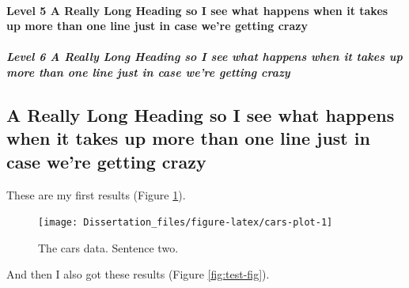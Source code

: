 \documentclass[
  10pt,
]{report}
\begin{document}
\hypertarget{level-5-a-really-long-heading-so-i-see-what-happens-when-it-takes-up-more-than-one-line-just-in-case-were-getting-crazy}{%
\paragraph{Level 5 A Really Long Heading so I see what happens when it takes up more than one line just in case we're getting crazy}\label{level-5-a-really-long-heading-so-i-see-what-happens-when-it-takes-up-more-than-one-line-just-in-case-were-getting-crazy}}

\hypertarget{level-6-a-really-long-heading-so-i-see-what-happens-when-it-takes-up-more-than-one-line-just-in-case-were-getting-crazy}{%
\subparagraph{Level 6 A Really Long Heading so I see what happens when it takes up more than one line just in case we're getting crazy}\label{level-6-a-really-long-heading-so-i-see-what-happens-when-it-takes-up-more-than-one-line-just-in-case-were-getting-crazy}}

\hypertarget{a-really-long-heading-so-i-see-what-happens-when-it-takes-up-more-than-one-line-just-in-case-were-getting-crazy-1}{%
\subsection{A Really Long Heading so I see what happens when it takes up more than one line just in case we're getting crazy}\label{a-really-long-heading-so-i-see-what-happens-when-it-takes-up-more-than-one-line-just-in-case-were-getting-crazy-1}}

These are my first results (Figure \ref{fig:cars-plot}).

\begin{figure}
\texttt{[image: Dissertation\_files/figure-latex/cars-plot-1]} \caption[The cars data.]{The cars data. Sentence two.}\label{fig:cars-plot}
\end{figure}

And then I also got these results (Figure \ref{fig:test-fig}).
\end{document}
